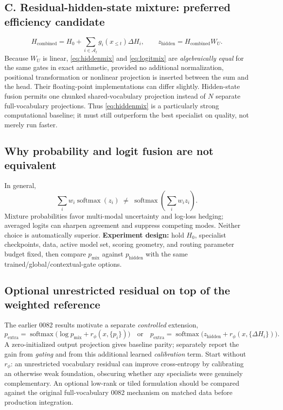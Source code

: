 \documentclass[11pt,letterpaper]{article}
\newcommand{\softmax}{\operatorname{softmax}}
\begin{document}
\subsection{C. Residual-hidden-state mixture: preferred efficiency candidate}
\begin{equation}
 H_{\mathrm{combined}}=H_0+\sum_{i\in\mathcal A_t}g_i(x_{\le t})\Delta H_i,
 \qquad z_{\mathrm{hidden}}=H_{\mathrm{combined}}W_U.
 \label{eq:hiddenmix}
\end{equation}
Because $W_U$ is linear, \eqref{eq:hiddenmix} and \eqref{eq:logitmix} are \emph{algebraically equal} for the same gates in exact arithmetic, provided no additional normalization, positional transformation or nonlinear projection is inserted between the sum and the head. Their floating-point implementations can differ slightly. Hidden-state fusion permits one chunked shared-vocabulary projection instead of $N$ separate full-vocabulary projections. Thus \eqref{eq:hiddenmix} is a particularly strong computational baseline; it must still outperform the best specialist on quality, not merely run faster.

\subsection{Why probability and logit fusion are not equivalent}
In general,
\begin{equation}
 \sum_i w_i\softmax(z_i)\;\neq\;
 \softmax\!\left(\sum_iw_i z_i\right).
\end{equation}
Mixture probabilities favor multi-modal uncertainty and log-loss hedging; averaged logits can sharpen agreement and suppress competing modes. Neither choice is automatically superior. \textbf{Experiment design:} hold $H_0$, specialist checkpoints, data, active model set, scoring geometry, and routing parameter budget fixed, then compare $p_{\mathrm{mix}}$ against $p_{\mathrm{hidden}}$ with the same trained/global/contextual-gate options.

\subsection{Optional unrestricted residual on top of the weighted reference}
The earlier 0082 results motivate a separate \emph{controlled} extension,
\begin{equation}
 p_{\mathrm{extra}}=\softmax\bigl(\log p_{\mathrm{mix}} + r_\phi(x,\{p_i\})\bigr)
 \quad\text{or}\quad
 p_{\mathrm{extra}}=\softmax\bigl(z_{\mathrm{hidden}}+r_\phi(x,\{\Delta H_i\})\bigr).
 \label{eq:extra}
\end{equation}
A zero-initialized output projection gives baseline parity; separately report the gain from \emph{gating} and from this additional learned \emph{calibration} term. Start without $r_\phi$: an unrestricted vocabulary residual can improve cross-entropy by calibrating an otherwise weak foundation, obscuring whether any specialists were genuinely complementary. An optional low-rank or tiled formulation should be compared against the original full-vocabulary 0082 mechanism on matched data before production integration.
\end{document}

